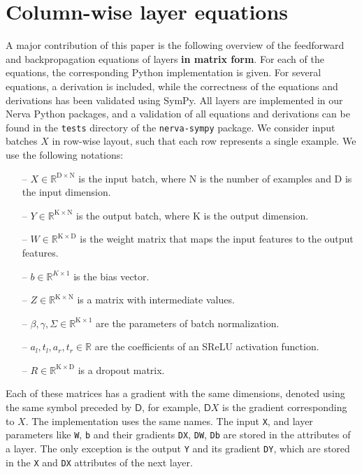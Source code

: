 \documentclass{article}
\newcommand{\const}[1]{\ensuremath{\mathrm{#1}}} %
\newcommand{\Gradient}{\textsf{D}}
\newcommand{\Reals}{\mathbb{R}}
\begin{document}
\section{Column-wise layer equations} \label{section:column-wise-layers}
A major contribution of this paper is the following overview of the feedforward and backpropagation equations of layers \textbf{in matrix form}. For each of the equations, the corresponding Python implementation is given. For several equations, a derivation is included, while the correctness of the equations and derivations has been validated using SymPy. All layers are implemented in our Nerva Python packages, and a validation of all equations and derivations can be found in the \texttt{tests} directory of the \texttt{nerva-sympy} package. We consider input batches $X$ in row-wise layout, such that each row represents a single example. We use the following notations:
\begin{enumerate}
    \item[--] $X \in \Reals^{\const{D} \times \const{N}}$ is the input batch, where $\const{N}$ is the number of examples and $\const{D}$ is the input dimension.
    \item[--] $Y \in \Reals^{\const{K} \times \const{N}}$ is the output batch, where $\const{K}$ is the output dimension.
    \item[--] $W \in \Reals^{\const{K} \times \const{D}}$ is the weight matrix that maps the input features to the output features.
    \item[--] $b \in \Reals^{K \times \const{1}}$ is the bias vector.
    \item[--] $Z \in \Reals^{\const{K} \times \const{N}}$ is a matrix with intermediate values.
    \item[--] $\beta, \gamma, \Sigma \in \Reals^{\const{K} \times 1}$ are the parameters of batch normalization.
    \item [--] $a_l, t_l, a_r, t_r \in \Reals$ are the coefficients of an SReLU activation function.
    \item[--] $R \in \Reals^{\const{K} \times \const{D}}$ is a dropout matrix.
\end{enumerate}
Each of these matrices has a gradient with the same dimensions, denoted using the same symbol preceded by $\Gradient{}$, for example, $\Gradient{X}$ is the gradient corresponding to $X$. The implementation uses the same names. The input \texttt{X}, and layer parameters like \texttt{W}, \texttt{b} and their gradients \texttt{DX}, \texttt{DW}, \texttt{Db} are stored in the attributes of a layer. The only exception is the output \texttt{Y} and its gradient \texttt{DY}, which are stored in the \texttt{X} and \texttt{DX} attributes of the next layer.
\end{document}
